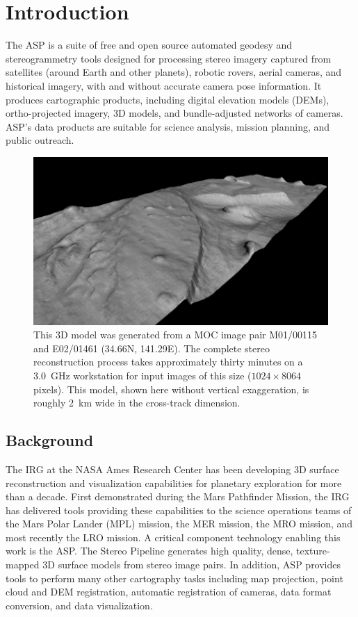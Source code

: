 \chapter{Introduction}

\acresetall

The  \ac{ASP} is a suite of free and open source automated
geodesy and stereogrammetry tools designed for processing stereo imagery
captured from satellites (around Earth and other planets), robotic
rovers, aerial cameras, and historical imagery, with and without
accurate camera pose information. It produces cartographic products,
including digital elevation models (DEMs), ortho-projected imagery, 3D
models, and bundle-adjusted networks of cameras. ASP's data products are
suitable for science analysis, mission planning, and public outreach.

\begin{figure}[tb]
   \centering
   \includegraphics[width=6.5in]{images/introduction/p19view2_400px.png}
   \caption{This 3D model was generated from a \acf{MOC} image
     pair M01/00115 and E02/01461 (34.66N, 141.29E).  The complete
     stereo reconstruction process takes approximately thirty minutes on
     a 3.0~GHz workstation for input images of this size ($1024 \times 8064$
     pixels).  This model, shown here without vertical
     exaggeration, is roughly 2~km wide in the cross-track
     dimension. }
   \label{fig:p19}
\end{figure}

\section{Background}

The \ac{IRG} at the NASA Ames Research Center has been developing
3D surface reconstruction and visualization capabilities for planetary
exploration for more than a decade.  First demonstrated during the
Mars Pathfinder Mission, the \ac{IRG} has delivered tools providing
these capabilities to the science operations teams of the Mars Polar
Lander (MPL) mission, the \ac{MER} mission, the \ac{MRO} mission,
and most recently the \ac{LRO} mission. A critical component
technology enabling this work is the \acf{ASP}.  The Stereo Pipeline
generates high quality, dense, texture-mapped 3D surface models
from stereo image pairs.  In addition, ASP provides tools to
perform many other cartography tasks including map projection,
point cloud and DEM registration, automatic registration of
cameras, data format conversion, and data visualization.


